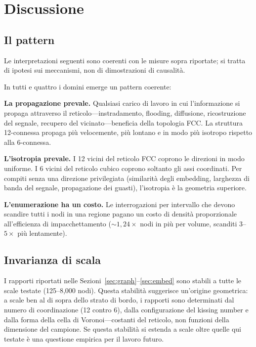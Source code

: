 \documentclass[11pt]{article}
\begin{document}
\section{Discussione}
\label{sec:discussion}

\subsection{Il pattern}

Le interpretazioni seguenti sono coerenti con le misure sopra riportate;
si tratta di ipotesi sui meccanismi, non di dimostrazioni di causalit\`a.

In tutti e quattro i domini emerge un pattern coerente:

\textbf{La propagazione prevale.} Qualsiasi carico di lavoro in cui
l'informazione si propaga attraverso il reticolo---instradamento,
flooding, diffusione, ricostruzione del segnale, recupero del
vicinato---beneficia della topologia FCC. La struttura 12-connessa
propaga pi\`u velocemente, pi\`u lontano e in modo pi\`u isotropo
rispetto alla 6-connessa.

\textbf{L'isotropia prevale.} I 12 vicini del reticolo FCC coprono le
direzioni in modo uniforme. I 6 vicini del reticolo cubico coprono
soltanto gli assi coordinati. Per compiti senza una direzione
privilegiata (similarit\`a degli embedding, larghezza di banda del
segnale, propagazione dei guasti), l'isotropia \`e la geometria
superiore.

\textbf{L'enumerazione ha un costo.} Le interrogazioni per intervallo
che devono scandire tutti i nodi in una regione pagano un costo di
densit\`a proporzionale all'efficienza di impacchettamento
(${\sim}1{,}24\times$ nodi in pi\`u per volume, scanditi
$3$--$5\times$ pi\`u lentamente).

\subsection{Invarianza di scala}

I rapporti riportati nelle
Sezioni~\ref{sec:graph}--\ref{sec:embed} sono stabili a tutte le scale
testate (125--8{,}000 nodi). Questa stabilit\`a suggerisce un'origine
geometrica: a scale ben al di sopra dello strato di bordo, i rapporti
sono determinati dal numero di coordinazione (12 contro 6), dalla
configurazione del kissing number e dalla forma della cella di
Voronoi---costanti del reticolo, non funzioni della dimensione del
campione. Se questa stabilit\`a si estenda a scale oltre quelle qui
testate \`e una questione empirica per il lavoro futuro.
\end{document}
